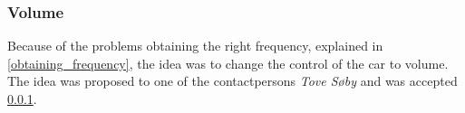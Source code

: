 \subsubsection{Volume}
Because of the problems obtaining the right frequency, explained in \cref{obtaining_frequency}, the idea was to change the control of the car to volume.
The idea was proposed to one of the contactpersons \textit{Tove Søby} and was accepted \cref{}.